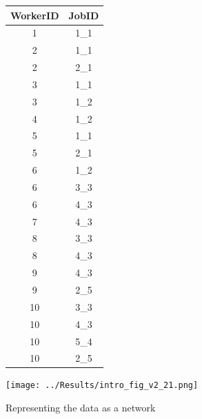 \documentclass[12pt]{article}
\theoremstyle{definition}
\theoremstyle{plain}
\begin{document}
\begin{figure}
	\caption{Representing the data as a network}
	\begin{minipage}{.5\textwidth}
		\centering
		\begin{tabular}{cc}
			\toprule
			WorkerID	& JobID	\\
			\midrule
			1	& 1\_1	\\
			2	& 1\_1	\\
			2	& 2\_1	\\
			3	& 1\_1	\\
			3	& 1\_2	\\
			4	& 1\_2	\\
			5	& 1\_1	\\
			5	& 2\_1	\\
			6	& 1\_2	\\
			6	& 3\_3	\\
			6	& 4\_3	\\
			7	& 4\_3	\\
			8	& 3\_3	\\
			8	& 4\_3	\\
			9	& 4\_3	\\
			9	& 2\_5	\\
			10	& 3\_3	\\
			10	& 4\_3	\\
			10	& 5\_4	\\
			10	& 2\_5	\\
			\bottomrule
		\end{tabular}
	\end{minipage}
	\begin{minipage}{.5\textwidth}
		\centering
		\texttt{[image: ../Results/intro\_fig\_v2\_21.png]} 
	\end{minipage}%
	\label{fig:network_representation}
\end{figure}
\end{document}
